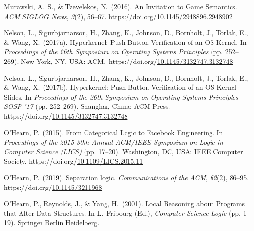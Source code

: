 \documentclass[12pt,twoside]{article}
\begin{document}
{\begin{thebibliography}{222}
Murawski, A.~S., \& Tzevelekos, N.~(2016). An Invitation to Game Semantics. \emph{ACM SIGLOG News}, \emph{3}(2), 56–67. https://doi.org/\href{https://dx.doi.org/10.1145/2948896.2948902}{10.1145/2948896.2948902}\label{murawski_invitation_2016}%

\mdbibitemlabel{[Nelson et al., 2017a]}Nelson, L., Sigurbjarnarson, H., Zhang, K., Johnson, D., Bornholt, J., Torlak, E., \& Wang, X.~(2017a). Hyperkernel: Push-Button Verification of an OS Kernel. In \emph{Proceedings of the 26th Symposium on Operating Systems Principles} (pp. 252–269). New York, NY, USA: ACM.~https://doi.org/\href{https://dx.doi.org/10.1145/3132747.3132748}{10.1145/3132747.3132748}\label{nelson_hyperkernel:_2017}%

\mdbibitemlabel{[Nelson et al., 2017b]}Nelson, L., Sigurbjarnarson, H., Zhang, K., Johnson, D., Bornholt, J., Torlak, E., \& Wang, X.~(2017b). Hyperkernel: Push-Button Verification of an OS Kernel - Slides. In \emph{Proceedings of the 26th Symposium on Operating Systems Principles~- SOSP ’17} (pp. 252–269). Shanghai, China: ACM Press. https://doi.org/\href{https://dx.doi.org/10.1145/3132747.3132748}{10.1145/3132747.3132748}\label{nelson_hyperkernel:_2017-1}%

\mdbibitemlabel{[P. O’Hearn, 2015]}O’Hearn, P.~(2015). From Categorical Logic to Facebook Engineering. In \emph{Proceedings of the 2015 30th Annual ACM/IEEE Symposium on Logic in Computer Science (LICS)} (pp. 17–20). Washington, DC, USA: IEEE Computer Society. https://doi.org/\href{https://dx.doi.org/10.1109/LICS.2015.11}{10.1109/LICS.2015.11}\label{ohearn_categorical_2015}%

\mdbibitemlabel{[P. O’Hearn, 2019]}O’Hearn, P.~(2019). Separation logic. \emph{Communications of the ACM}, \emph{62}(2), 86–95. https://doi.org/\href{https://dx.doi.org/10.1145/3211968}{10.1145/3211968}\label{ohearn_separation_2019}%

O’Hearn, P., Reynolds, J., \& Yang, H.~(2001). Local Reasoning about Programs that Alter Data Structures. In L.~Fribourg (Ed.), \emph{Computer Science Logic} (pp. 1–19). Springer Berlin Heidelberg.\label{ohearn_local_2001}%


\end{thebibliography}}
\end{document}
